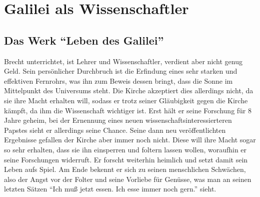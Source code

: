 \documentclass[12pt]{scrreprt}
\begin{document}
\chapter{Galilei als Wissenschaftler}
	\label{chap:galilei als wissenschaftler}
\section{Das Werk \enquote{Leben des Galilei}}
	\label{sec:das werk leben des galilei}
Brecht unterrichtet, ist Lehrer und Wissenschaftler, verdient aber nicht genug Geld.
Sein persönlicher Durchbruch ist die Erfindung eines sehr starken und effektiven Fernrohrs, was ihn zum Beweis dessen bringt, dass die Sonne im Mittelpunkt des Universums steht.
Die Kirche akzeptiert dies allerdings nicht, da sie ihre Macht erhalten will, sodass er trotz seiner Gläubigkeit gegen die Kirche kämpft, da ihm die Wissenschaft wichtiger ist.
Erst hält er seine Forschung für 8 Jahre geheim, bei der Ernennung eines neuen wissenschaftsinteressierteren Papstes sieht er allerdings seine Chance.
Seine dann neu veröffentlichten Ergebnisse gefallen der Kirche aber immer noch nicht.
Diese will ihre Macht sogar so sehr erhalten, dass sie ihn einsperren und foltern lassen wollen, woraufhin er seine Forschungen widerruft.
Er forscht weiterhin heimlich und setzt damit sein Leben aufs Spiel.
Am Ende bekennt er sich zu seinen menschlichen Schwächen, also der Angst vor der Folter und seine Vorliebe für Genüsse, was man an seinen letzten Sätzen \enquote{Ich muß jetzt essen. Ich esse immer noch gern.} sieht.
\autocite{wiki:Galilei_Studyflix}
\autocite{wiki:Leben_des_Galilei}
\end{document}
